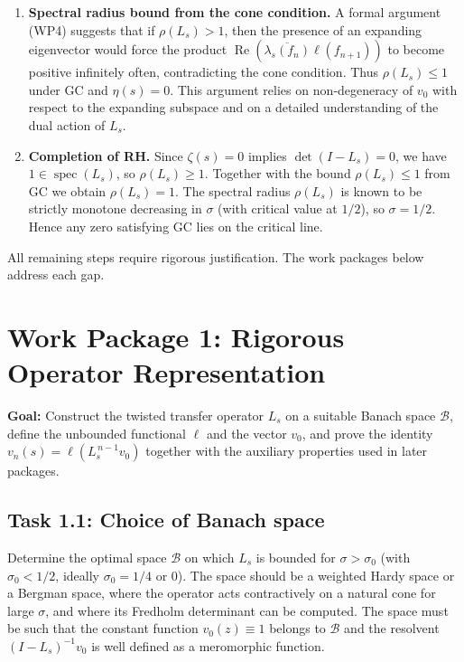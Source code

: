 \documentclass[11pt,a4paper]{article}
\newcommand{\spec}{\operatorname{spec}}
\newcommand{\RE}{\operatorname{Re}}
\begin{document}
\begin{enumerate}[label=(\arabic*)]
\item \textbf{Spectral radius bound from the cone condition.}  A formal argument (WP4) suggests that if $\rho(L_s) > 1$, then the presence of an expanding eigenvector would force the product $\RE( \overline{\lambda_s(f_n)} \ell( f_{n+1} ) )$ to become positive infinitely often, contradicting the cone condition.  Thus $\rho(L_s) \le 1$ under GC and $\eta(s)=0$.  This argument relies on non‑degeneracy of $v_0$ with respect to the expanding subspace and on a detailed understanding of the dual action of $L_s$.

\item \textbf{Completion of RH.}  Since $\zeta(s)=0$ implies $\det(I - L_s)=0$, we have $1 \in \spec(L_s)$, so $\rho(L_s) \ge 1$.  Together with the bound $\rho(L_s) \le 1$ from GC we obtain $\rho(L_s) = 1$.  The spectral radius $\rho(L_s)$ is known to be strictly monotone decreasing in $\sigma$ (with critical value at $1/2$), so $\sigma = 1/2$.  Hence any zero satisfying GC lies on the critical line.

\end{enumerate}

All remaining steps require rigorous justification.  The work packages below address each gap.

\section{Work Package 1: Rigorous Operator Representation}

\textbf{Goal:}  Construct the twisted transfer operator $L_s$ on a suitable Banach space $\mathcal{B}$, define the unbounded functional $\ell$ and the vector $v_0$, and prove the identity $v_n(s) = \ell( L_s^{\,n-1} v_0 )$ together with the auxiliary properties used in later packages.

\subsection{Task 1.1: Choice of Banach space}
Determine the optimal space $\mathcal{B}$ on which $L_s$ is bounded for $\sigma > \sigma_0$ (with $\sigma_0 < 1/2$, ideally $\sigma_0 = 1/4$ or $0$).  The space should be a weighted Hardy space or a Bergman space, where the operator acts contractively on a natural cone for large $\sigma$, and where its Fredholm determinant can be computed.  The space must be such that the constant function $v_0(z) \equiv 1$ belongs to $\mathcal{B}$ and the resolvent $(I-L_s)^{-1} v_0$ is well defined as a meromorphic function.
\end{document}
